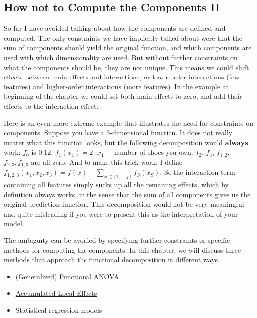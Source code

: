\documentclass[
  12pt,
]{krantz}
\providecommand{\tightlist}{%
  \setlength{\itemsep}{0pt}\setlength{\parskip}{0pt}}
\begin{document}
\hypertarget{how-not-to-compute-the-components-ii}{%
\subsection{How not to Compute the Components II}\label{how-not-to-compute-the-components-ii}}

So far I have avoided talking about how the components are defined and computed.
The only constraints we have implicitly talked about were that the sum of components should yield the original function, and which components are used with which dimensionality are used.
But without further constraints on what the components should be, they are not unique.
This means we could shift effects between main effects and interactions, or lower order interactions (few features) and higher-order interactions (more features).
In the example at beginning of the chapter we could set both main effects to zero, and add their effects to the interaction effect.

Here is an even more extreme example that illustrates the need for constraints on components.
Suppose you have a 3-dimensional function.
It does not really matter what this function looks, but the following decomposition would \textbf{always} work:
\(f_0\) is 0.12.
\(f_1(x_1)=2\cdot{}x_1\) + number of shoes you own.
\(f_2\), \(f_3\), \(f_{1,2}\), \(f_{2,3}, f_{1,3}\) are all zero.
And to make this trick work, I define \(f_{1,2,3}(x_1,x_2,x_3)=f(x)-\sum_{S\subset\{1,\ldots,p\}}f_S(x_S)\).
So the interaction term containing all features simply sucks up all the remaining effects, which by definition always works, in the sense that the sum of all components gives us the original prediction function.
This decomposition would not be very meaningful and quite misleading if you were to present this as the interpretation of your model.

The ambiguity can be avoided by specifying further constraints or specific methods for computing the components.
In this chapter, we will discuss three methods that approach the functional decomposition in different ways.

\begin{itemize}
\tightlist
\item
  (Generalized) Functional ANOVA
\item
  \protect\hyperlink{ale}{Accumulated Local Effects}
\item
  Statistical regression models
\end{itemize}
\end{document}
